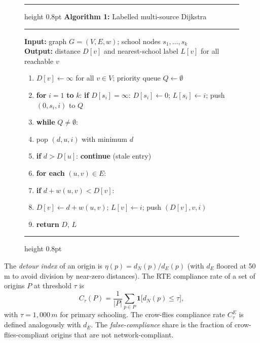 \documentclass[conference]{IEEEtran}
\newcommand{\m}{\,m}
\begin{document}
\begin{figure}[!t]
\hrule height 0.8pt\vspace{3pt}
\noindent\textbf{Algorithm 1:} Labelled multi-source Dijkstra\vspace{2pt}
\hrule\vspace{3pt}
{\footnotesize
\noindent\textbf{Input:} graph $G=(V,E,w)$; school nodes $s_1,\dots,s_k$\\
\textbf{Output:} distance $D[v]$ and nearest-school label $L[v]$ for all reachable $v$
\begin{enumerate}\setlength\itemsep{0pt}
\item $D[v]\leftarrow\infty$ for all $v\in V$; priority queue $Q\leftarrow\emptyset$
\item \textbf{for} $i=1$ \textbf{to} $k$: \textbf{if} $D[s_i]=\infty$: $D[s_i]\leftarrow0$; $L[s_i]\leftarrow i$; push $(0,s_i,i)$ to $Q$
\item \textbf{while} $Q\neq\emptyset$:
\item \quad pop $(d,u,i)$ with minimum $d$
\item \quad \textbf{if} $d>D[u]$: \textbf{continue} \hfill (stale entry)
\item \quad \textbf{for each} $(u,v)\in E$:
\item \quad\quad \textbf{if} $d+w(u,v)<D[v]$:
\item \quad\quad\quad $D[v]\leftarrow d+w(u,v)$; $L[v]\leftarrow i$; push $(D[v],v,i)$
\item \textbf{return} $D$, $L$
\end{enumerate}}
\vspace{-2pt}\hrule height 0.8pt
\end{figure}

The \emph{detour index} of an origin is $\eta(p)=d_N(p)/d_E(p)$ (with $d_E$ floored at 50\m{} to avoid division by near-zero distances). The RTE compliance rate of a set of origins $P$ at threshold $\tau$ is
\begin{equation}
C_\tau(P)=\frac{1}{|P|}\sum_{p\in P}\mathbf{1}\big[d_N(p)\le\tau\big],
\end{equation}
with $\tau=1{,}000\m{}$ for primary schooling. The crow-flies compliance rate $C^E_\tau$ is defined analogously with $d_E$. The \emph{false-compliance} share is the fraction of crow-flies-compliant origins that are not network-compliant.
\end{document}
